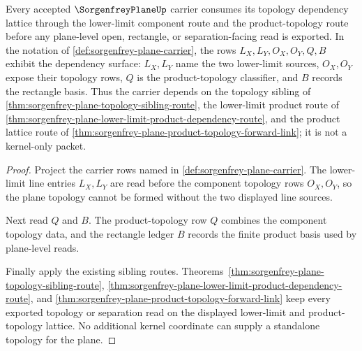 \begin{theorem}
\label{thm:sorgenfrey-plane-topology-sibling-lattice-repair}
Every accepted $\SorgenfreyPlaneUp$ carrier consumes its topology dependency lattice through the lower-limit component route and the product-topology route before any plane-level open, rectangle, or separation-facing read is exported. In the notation of \autoref{def:sorgenfrey-plane-carrier}, the rows $L_X,L_Y,O_X,O_Y,Q,B$ exhibit the dependency surface: $L_X,L_Y$ name the two lower-limit sources, $O_X,O_Y$ expose their topology rows, $Q$ is the product-topology classifier, and $B$ records the rectangle basis. Thus the carrier depends on the topology sibling of \autoref{thm:sorgenfrey-plane-topology-sibling-route}, the lower-limit product route of \autoref{thm:sorgenfrey-plane-lower-limit-product-dependency-route}, and the product lattice route of \autoref{thm:sorgenfrey-plane-product-topology-forward-link}; it is not a kernel-only packet.
\end{theorem}
\begin{proof}
Project the carrier rows named in \autoref{def:sorgenfrey-plane-carrier}. The lower-limit line entries $L_X,L_Y$ are read before the component topology rows $O_X,O_Y$, so the plane topology cannot be formed without the two displayed line sources.

Next read $Q$ and $B$. The product-topology row $Q$ combines the component topology data, and the rectangle ledger $B$ records the finite product basis used by plane-level reads.

Finally apply the existing sibling routes. Theorems~\ref{thm:sorgenfrey-plane-topology-sibling-route}, \ref{thm:sorgenfrey-plane-lower-limit-product-dependency-route}, and \ref{thm:sorgenfrey-plane-product-topology-forward-link} keep every exported topology or separation read on the displayed lower-limit and product-topology lattice. No additional kernel coordinate can supply a standalone topology for the plane.
\end{proof}
